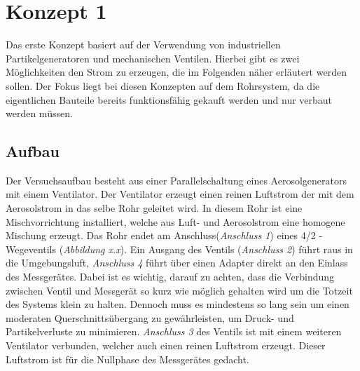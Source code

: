 \section{Konzept 1}
Das erste Konzept basiert auf der Verwendung von industriellen Partikelgeneratoren und mechanischen Ventilen. Hierbei gibt es zwei M\"{o}glichkeiten den Strom zu erzeugen, die im Folgenden n\"{a}her erl\"{a}utert werden sollen. Der Fokus liegt bei diesen Konzepten auf dem Rohrsystem, da die eigentlichen Bauteile bereits funktionsf\"{a}hig gekauft werden und nur verbaut werden m\"{u}ssen.

\subsection{Aufbau}
Der Versuchsaufbau besteht aus einer Parallelschaltung eines Aerosolgenerators mit einem Ventilator. Der Ventilator erzeugt einen reinen Luftstrom der mit dem Aerosolstrom in das selbe Rohr geleitet wird. In diesem Rohr ist eine Mischvorrichtung installiert, welche aus Luft- und Aerosolstrom eine homogene Mischung erzeugt. Das Rohr endet am Anschluss(\textit{Anschluss 1}) eines 4/2 - Wegeventils (\textit{Abbildung x.x}). Ein Ausgang des Ventils (\textit{Anschluss 2}) f\"{u}hrt raus in die Umgebungsluft, \textit{Anschluss 4} f\"{u}hrt \"{u}ber einen Adapter direkt an den Einlass des Messger\"{a}tes. Dabei ist es wichtig, darauf zu achten, dass die Verbindung zwischen Ventil und Messger\"{a}t so kurz wie m\"{o}glich gehalten wird um die Totzeit des Systems klein zu halten. Dennoch muss es mindestens so lang sein um einen moderaten Querschnitts\"{u}bergang zu gew\"{a}hrleisten, um Druck- und Partikelverluste zu minimieren. \textit{Anschluss 3} des Ventils ist mit einem weiteren Ventilator verbunden, welcher auch einen reinen Luftstrom erzeugt. Dieser Luftstrom ist für die Nullphase des Messger\"{a}tes gedacht.

